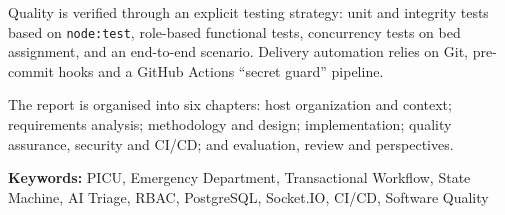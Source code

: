 Quality is verified through an explicit testing strategy: unit and integrity tests based on \texttt{node:test}, role-based functional tests, concurrency tests on bed assignment, and an end-to-end scenario. Delivery automation relies on Git, pre-commit hooks and a GitHub Actions “secret guard” pipeline.

The report is organised into six chapters: host organization and context; requirements analysis; methodology and design; implementation; quality assurance, security and CI/CD; and evaluation, review and perspectives.

\textbf{Keywords:} PICU, Emergency Department, Transactional Workflow, State Machine, AI Triage, RBAC, PostgreSQL, Socket.IO, CI/CD, Software Quality

